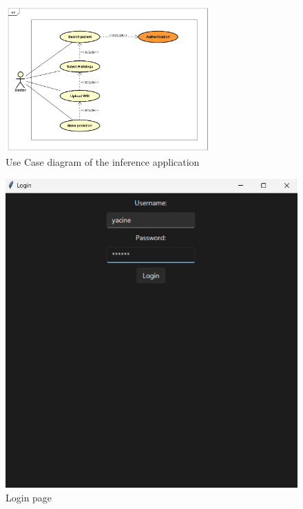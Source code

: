 \documentclass[
11pt, %
english, %
singlespacing, %
headsepline, %
]{project_structure}
\begin{document}
\begin{figure}[H]
    \centering
    \includegraphics[width=0.7\textwidth]{figures/SI/uc_app.png}
    \caption{Use Case diagram of the inference application}
    \label{fig:uc_desktop}
\end{figure}

\begin{figure}[H]
    \centering
    \includegraphics[width=0.75\linewidth]{figures/SI/desktop/login.png}
    \caption{Login page}
    \label{fig:app_login}
\end{figure}
\end{document}
